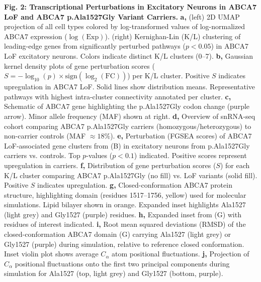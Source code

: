 \textbf{Fig. 2: Transcriptional Perturbations in Excitatory Neurons in ABCA7 LoF and ABCA7 p.Ala1527Gly Variant Carriers.}\newline
\textbf{a,} (left) 2D UMAP projection of all cell types colored by log-transformed values of log-normalized ABCA7 expression ($\log(\text{Exp})$). (right) Kernighan-Lin (K/L) clustering of leading-edge genes from significantly perturbed pathways ($p<0.05$) in ABCA7 LoF excitatory neurons. Colors indicate distinct K/L clusters (0–7).
\textbf{b,} Gaussian kernel density plots of gene perturbation scores ($S=-\log_{10}(p)\times\text{sign}(\log_2(\text{FC}))$) per K/L cluster. Positive $S$ indicates upregulation in ABCA7 LoF. Solid lines show distribution means. Representative pathways with highest intra-cluster connectivity annotated per cluster.
\textbf{c,} Schematic of ABCA7 gene highlighting the p.Ala1527Gly codon change (purple arrow). Minor allele frequency (MAF) shown at right.
\textbf{d,} Overview of snRNA-seq cohort comparing ABCA7 p.Ala1527Gly carriers (homozygous/heterozygous) to non-carrier controls (MAF $\approx18\%$).
\textbf{e,} Perturbation (FGSEA scores) of ABCA7 LoF-associated gene clusters from (B) in excitatory neurons from p.Ala1527Gly carriers vs. controls. Top $p$-values ($p<0.1$) indicated. Positive scores represent upregulation in carriers.
\textbf{f,} Distribution of gene perturbation scores ($S$) for each K/L cluster comparing ABCA7 p.Ala1527Gly (no fill) vs. LoF variants (solid fill). Positive $S$ indicates upregulation.
\textbf{g,} Closed-conformation ABCA7 protein structure, highlighting domain (residues 1517–1756, yellow) used for molecular simulations. Lipid bilayer shown in orange. Expanded inset highlights Ala1527 (light grey) and Gly1527 (purple) residues.
\textbf{h,} Expanded inset from (G) with residues of interest indicated.
\textbf{i,} Root mean squared deviations (RMSD) of the closed-conformation ABCA7 domain (G) carrying Ala1527 (light grey) or Gly1527 (purple) during simulation, relative to reference closed conformation. Inset violin plot shows average $C_\alpha$ atom positional fluctuations.
\textbf{j,} Projection of $C_\alpha$ positional fluctuations onto the first two principal components during simulation for Ala1527 (top, light grey) and Gly1527 (bottom, purple).

